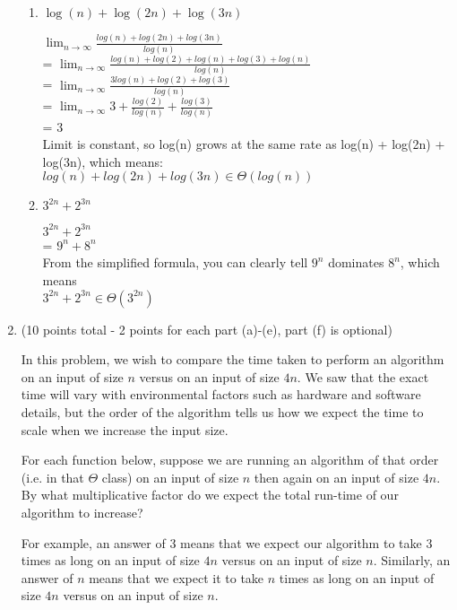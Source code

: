 \documentclass[11pt,letterpaper,unboxed,cm]{hmcpset}
\begin{document}
\begin{enumerate}
\begin{enumerate}
\item
$\log(n)+\log(2n)+\log(3n)$

\bigskip
$\lim_{n\to\infty} \frac{log(n) + log(2n) + log(3n)}{log(n)}$ \\
 = $\lim_{n\to\infty} \frac{log(n) + log(2) + log(n) + log(3) + log(n)}{log(n)}$ \\
 = $\lim_{n\to\infty} \frac{3log(n) + log(2) + log(3)}{log(n)}$ \\
 = $\lim_{n\to\infty} 3 + \frac{log(2)}{log(n)} + \frac{log(3)}{log(n)}$ \\
 = 3 \\
 Limit is constant, so log(n) grows at the same rate as log(n) + log(2n) + log(3n), which means: \\
 $log(n) + log(2n) + log(3n) \in \Theta(log(n))$
\bigskip

\item
$3^{2n}+2^{3n}$

\bigskip
$3^{2n} + 2^{3n}$ \\
= $9^{n} + 8^{n}$ \\
 From the simplified formula, you can clearly tell $9^{n}$ dominates $8^{n}$, which means \\
 $3^{2n} + 2^{3n} \in \Theta(3^{2n})$
\bigskip

\end{enumerate}



\bigskip
\item (10 points total - 2 points for each part (a)-(e), part (f) is optional)

In this problem, we wish to compare the time taken to perform an algorithm on an input of size $n$ versus on an input of size $4n$. We saw that the exact time will vary with environmental factors such as hardware and software details, but the order of the algorithm tells us how we expect the time to scale when we increase the input size.

For each function below, suppose we are running an algorithm of that order (i.e. in that $\Theta$ class) on an input of size $n$ then again on an input of size $4n$. By what multiplicative factor do we expect the total run-time of our algorithm to increase?

For example, an answer of $3$ means that we expect our algorithm to take $3$ times as long on an input of size $4n$ versus on an input of size $n$. Similarly, an answer of $n$ means that we expect it to take $n$ times as long on an input of size $4n$ versus on an input of size $n$.


\end{enumerate}
\end{document}
